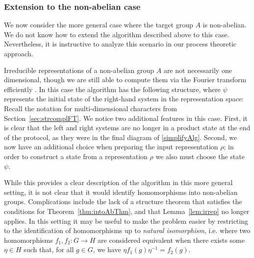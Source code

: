 \subsubsection*{Extension to the non-abelian case}
We now consider the more general case where the target group $A$ is non-abelian. We do not know how to extend the algorithm described above to this case.  Nevertheless, it is instructive to analyze this scenario in our process theoretic approach. 

Irreducible representations of a non-abelian group $A$ are not necessarily one dimensional, though we are still able to compute them via the Fourier transform efficiently \cite{childs2010quantum}. In this case the algorithm has the following structure, where $\psi$ represents the initial state of the right-hand system in the representation space:
\begin{equation}
\label{eq:NonAbAlg}

\end{equation}
Recall the notation for multi-dimensional characters from Section~\ref{sec:strcomplFT}. We notice two additional features in this case. First, it is clear that the left and right systems are no longer in a product state at the end of the protocol, as they were in the final diagram of \eqref{simplifyAlg}. Second, we now have an additional choice when preparing the input representation $\rho$; in order to construct a state from a representation $\rho$ we also must choose the state $\psi$.

While this provides a clear description of the algorithm in this more general setting, it is not clear that it would identify homomorphisms into non-abelian groups. Complications include the lack of a structure theorem that satisfies the conditions for Theorem~\ref{thm:intoAbThm}, and that Lemma~\ref{lem:irrep} no longer applies.  In this setting it may be useful to make the problem easier by restricting to the identification of homomorphisms up to \emph{natural isomorphism}, i.e. where two homomorphisms $f_1,f_2:G\to H$ are considered equivalent when there exists some $\eta\in H$ such that, for all $g\in G$, we have $\eta f_1(g) \eta^{-1} = f_2(g)$.


\newpage
